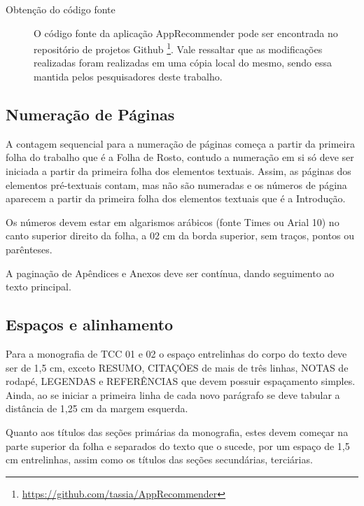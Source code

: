 \begin{description}

\item[Obtenção do código fonte]

O código fonte da aplicação AppRecommender pode ser encontrada no repositório de projetos Github \footnote{\url{https://github.com/tassia/AppRecommender}}.
Vale ressaltar que as modificações realizadas foram realizadas em uma cópia local do mesmo, sendo essa mantida pelos pesquisadores deste trabalho.

\end{description}




\subsection{Numeração de Páginas}

A contagem sequencial para a numeração de páginas começa a partir da
primeira folha do trabalho que é a Folha de Rosto, contudo a numeração em
si só deve ser iniciada a partir da primeira folha dos elementos textuais.
Assim, as páginas dos elementos pré-textuais contam, mas não são numeradas
e os números de página aparecem a partir da primeira folha dos elementos
textuais que é a Introdução.

Os números devem estar em algarismos arábicos (fonte Times ou Arial 10) no
canto superior direito da folha, a 02 cm da borda superior, sem traços,
pontos ou parênteses.

A paginação de Apêndices e Anexos deve ser contínua, dando seguimento ao
texto principal.

\subsection{Espaços e alinhamento}

Para a monografia de TCC 01 e 02 o espaço entrelinhas do corpo do texto
deve ser de 1,5 cm, exceto RESUMO, CITAÇÔES de mais de três linhas, NOTAS
de rodapé, LEGENDAS e REFERÊNCIAS que devem possuir espaçamento simples.
Ainda, ao se iniciar a primeira linha de cada novo parágrafo se deve
tabular a distância de 1,25 cm da margem esquerda.

Quanto aos títulos das seções primárias da monografia, estes devem começar
na parte superior da folha e separados do texto que o sucede, por um espaço
de 1,5 cm entrelinhas, assim como os títulos das seções secundárias,
terciárias.

